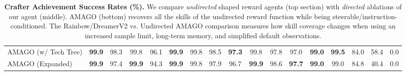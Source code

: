 \begin{table}[ht]
{\begin{tabular}{@{}lcccccccccccccccc@{}}
AMAGO (w/ Tech Tree) & \textbf{99.9}                                           & 98.3                                                     & 99.8                                                   & 96.1                                               & \textbf{99.9}                                          & 99.8                                                  & 98.5                                               & \textbf{97.3}                                            & 99.8                                                    & 97.8                                                     & 97.0                                                     & \textbf{99.0}                                            & \textbf{99.5}                                          & 84.0                                                    & 58.4                                                       & 0.0                                                              \\
AMAGO (Expanded)     & \textbf{99.9}                                           & 97.4                                                     & \textbf{99.9}                                          & 94.3                                               & \textbf{99.9}                                          & 99.8                                                  & 97.9                                               & 96.7                                                     & \textbf{99.9}                                           & 98.6                                                     & \textbf{97.7}                                            & \textbf{99.0}                                            & 99.0                                                   & 84.8                                                    & 40.4                                                       & 0.0                                                              \\ \bottomrule
\end{tabular}}
\caption{\textbf{Crafter Achievement Success Rates (\%).} We compare \textit{undirected} shaped reward agents (top section) with \textit{directed} ablations of our agent (middle). AMAGO (bottom) recovers all the skills of the undirected reward function while being steerable/instruction-conditioned. The Rainbow/DreamerV2 vs. Undirected AMAGO comparison measures how skill coverage changes when using an increased sample limit, long-term memory, and simplified default observations.}
\label{tbl:crafter}
\end{table}


